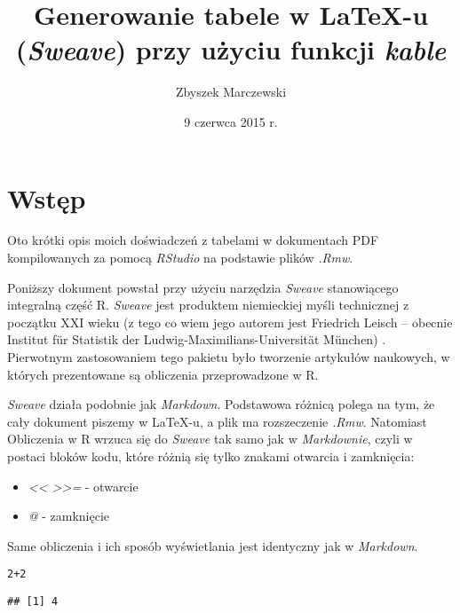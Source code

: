 \documentclass[a4paper, 10pt]{article}\usepackage[]{graphicx}\usepackage[]{color}
\makeatletter
\newcommand{\hlnum}[1]{\textcolor[rgb]{0.686,0.059,0.569}{#1}}%
\newcommand{\hlopt}[1]{\textcolor[rgb]{0,0,0}{#1}}%
\newenvironment{kframe}{%
 \def\at@end@of@kframe{}%
 \ifinner\ifhmode%
  \def\at@end@of@kframe{\end{minipage}}%
  \begin{minipage}{\columnwidth}%
 \fi\fi%
 \def\FrameCommand##1{\hskip\@totalleftmargin \hskip-\fboxsep
 \colorbox{shadecolor}{##1}\hskip-\fboxsep
     \hskip-\linewidth \hskip-\@totalleftmargin \hskip\columnwidth}%
 \MakeFramed {\advance\hsize-\width
   \@totalleftmargin\z@ \linewidth\hsize
   \@setminipage}}%
 {\par\unskip\endMakeFramed%
 \at@end@of@kframe}
\newenvironment{knitrout}{}{} %
\makeatother
\begin{document}
\title{Generowanie tabele w LaTeX-u (\emph{Sweave}) przy użyciu funkcji \emph{kable}}
\date{9 czerwca 2015 r.}
\author{ Zbyszek Marczewski}

\maketitle

\tableofcontents

\section{Wstęp}

Oto krótki opis moich doświadczeń z tabelami w dokumentach PDF kompilowanych za pomocą \emph{RStudio} na podstawie plików \emph{.Rmw}.
\vspace{5mm}

Poniższy dokument powstał przy użyciu narzędzia \emph{Sweave} stanowiącego integralną część R. \emph{Sweave} jest produktem niemieckiej myśli technicznej z początku XXI wieku (z tego co wiem jego autorem jest Friedrich Leisch – obecnie Institut für Statistik der Ludwig-Maximilians-Universität München) . Pierwotnym zastosowaniem tego pakietu było tworzenie artykułów naukowych, w których prezentowane są obliczenia przeprowadzone w R. 
\vspace{5mm}

\emph{Sweave} działa podobnie jak \emph{Markdown}. Podstawowa różnicą polega na tym, że cały dokument  piszemy w LaTeX-u, a plik ma rozszeczenie \emph{.Rmw}. Natomiast Obliczenia w R wrzuca się do \emph{Sweave} tak samo jak w \emph{Markdownie}, czyli w postaci bloków kodu, które różnią się tylko znakami otwarcia i zamknięcia:

\begin{itemize}
  \item \emph{<< >>=} - otwarcie
  \item \emph{@} - zamknięcie
\end{itemize}

Same obliczenia i ich sposób wyświetlania jest identyczny jak w \emph{Markdown}.

\begin{knitrout}
\color{fgcolor}\begin{kframe}
\begin{alltt}
\hlnum{2}\hlopt{+}\hlnum{2}
\end{alltt}
\begin{verbatim}
## [1] 4
\end{verbatim}
\end{kframe}
\end{knitrout}
\end{document}

